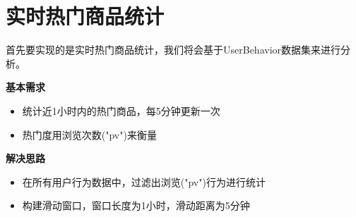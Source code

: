 \documentclass[oneside]{ctexbook}
\begin{document}
\section{实时热门商品统计}

首先要实现的是实时热门商品统计，我们将会基于UserBehavior数据集来进行分析。

\textbf{基本需求}

\begin{itemize}
\item 统计近1小时内的热门商品，每5分钟更新一次
\item 热门度用浏览次数("pv")来衡量
\end{itemize}

\textbf{解决思路}

\begin{itemize}
\item 在所有用户行为数据中，过滤出浏览("pv")行为进行统计
\item 构建滑动窗口，窗口长度为1小时，滑动距离为5分钟
\end{itemize}
\end{document}
